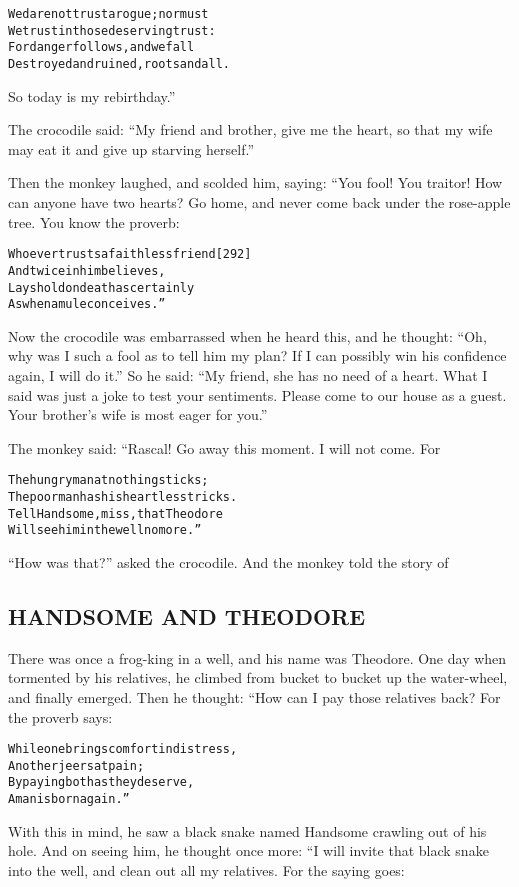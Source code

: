 \documentclass{article}
\renewenvironment{verbatim}{\begin{alltt}\normalfont\begin{centering}}{\end{centering}\end{alltt}}
\begin{document}
\begin{verbatim}
We dare not trust a rogue; nor must
We trust in those deserving trust:
For danger follows, and we fall
Destroyed and ruined, roots and all.
\end{verbatim}
So today is my rebirthday.”

The crocodile said:
``My friend and brother, give me the heart, so that my wife may eat it and give up starving herself.''

Then the monkey laughed, and scolded him, saying: “You fool! You
traitor! How can anyone have two hearts? Go home, and never come
back under the rose-apple tree. You know the proverb:

\begin{verbatim}
Whoever trusts a faithless friend                       [292]
    And twice in him believes,
Lays hold on death as certainly
    As when a mule conceives.”
\end{verbatim}
Now the crocodile was embarrassed when he heard this, and he
thought:
``Oh, why was I such a fool as to tell him my plan? If I can possibly win his confidence again, I will do it.''
So he said:
``My friend, she has no need of a heart. What I said was just a joke to test your sentiments. Please come to our house as a guest. Your brother's wife is most eager for you.''

The monkey said: “Rascal! Go away this moment. I will not come.
For

\begin{verbatim}
The hungry man at nothing sticks;
The poor man has his heartless tricks.
Tell Handsome, miss, that Theodore
Will see him in the well no more.”
\end{verbatim}
``How was that?'' asked the crocodile. And the monkey told the
story of

\subsection{HANDSOME AND THEODORE}

There was once a frog-king in a well, and his name was Theodore.
One day when tormented by his relatives, he climbed from bucket to
bucket up the water-wheel, and finally emerged. Then he thought:
“How can I pay those relatives back? For the proverb says:

\begin{verbatim}
While one brings comfort in distress,
    Another jeers at pain;
By paying both as they deserve,
    A man is born again.”
\end{verbatim}
With this in mind, he saw a black snake named Handsome crawling out
of his hole. And on seeing him, he thought once more: “I will
invite that black snake into the well, and clean out all my
relatives. For the saying goes:
\end{document}
